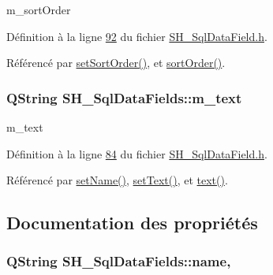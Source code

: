 m\-\_\-sort\-Order 



Définition à la ligne \hyperlink{SH__SqlDataField_8h_source_l00092}{92} du fichier \hyperlink{SH__SqlDataField_8h_source}{S\-H\-\_\-\-Sql\-Data\-Field.\-h}.



Référencé par \hyperlink{classSH__SqlDataFields_a6ace4d4f29e74ce3ed81f75a2c278e83}{set\-Sort\-Order()}, et \hyperlink{classSH__SqlDataFields_af7ecc3a493545e81e6959d778352d9ac}{sort\-Order()}.

\hypertarget{classSH__SqlDataFields_a55352d3aea0863fcab26c948babe8523}{
\subsubsection[{m\-\_\-text}]{\setlength{\rightskip}{0pt plus 5cm}Q\-String S\-H\-\_\-\-Sql\-Data\-Fields\-::m\-\_\-text\hspace{0.3cm}{\ttfamily [private]}}}\label{classSH__SqlDataFields_a55352d3aea0863fcab26c948babe8523}


m\-\_\-text 



Définition à la ligne \hyperlink{SH__SqlDataField_8h_source_l00084}{84} du fichier \hyperlink{SH__SqlDataField_8h_source}{S\-H\-\_\-\-Sql\-Data\-Field.\-h}.



Référencé par \hyperlink{classSH__SqlDataFields_ab658a817f459e5d0a8c0f5c4e8c28a9d}{set\-Name()}, \hyperlink{classSH__SqlDataFields_a377b4964546e91bd344c8c6f5190a833}{set\-Text()}, et \hyperlink{classSH__SqlDataFields_a7d8b3f434dc35ee83a9d8d9811e0e8eb}{text()}.



\subsection{Documentation des propriétés}
\hypertarget{classSH__SqlDataFields_a470f53e16cc7918594b5b727290ed9d2}{
\subsubsection[{name}]{\setlength{\rightskip}{0pt plus 5cm}Q\-String S\-H\-\_\-\-Sql\-Data\-Fields\-::name\hspace{0.3cm}{\ttfamily [read]}, {\ttfamily [write]}}}\label{classSH__SqlDataFields_a470f53e16cc7918594b5b727290ed9d2}


